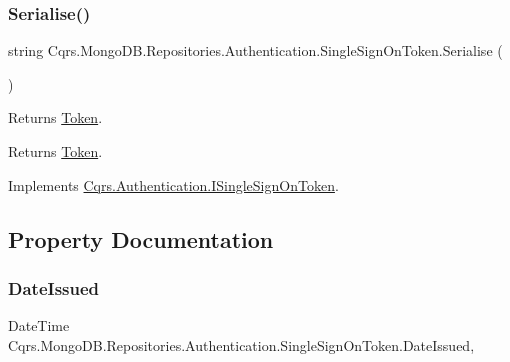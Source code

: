 \subsubsection{\texorpdfstring{Serialise()}{Serialise()}}
{\footnotesize\ttfamily string Cqrs.\+Mongo\+D\+B.\+Repositories.\+Authentication.\+Single\+Sign\+On\+Token.\+Serialise (\begin{DoxyParamCaption}{ }\end{DoxyParamCaption})}



Returns \hyperlink{classCqrs_1_1MongoDB_1_1Repositories_1_1Authentication_1_1SingleSignOnToken_abf59456bf30dd139620ed6de3ee11e74_abf59456bf30dd139620ed6de3ee11e74}{Token}. 

\begin{DoxyReturn}{Returns}
\hyperlink{classCqrs_1_1MongoDB_1_1Repositories_1_1Authentication_1_1SingleSignOnToken_abf59456bf30dd139620ed6de3ee11e74_abf59456bf30dd139620ed6de3ee11e74}{Token}.
\end{DoxyReturn}


Implements \hyperlink{interfaceCqrs_1_1Authentication_1_1ISingleSignOnToken_af34e8c0b052865d687064d3381bfbcdb_af34e8c0b052865d687064d3381bfbcdb}{Cqrs.\+Authentication.\+I\+Single\+Sign\+On\+Token}.



\subsection{Property Documentation}
\mbox{\label{classCqrs_1_1MongoDB_1_1Repositories_1_1Authentication_1_1SingleSignOnToken_acf0a5524d873b709b3955374ec6cc76d_acf0a5524d873b709b3955374ec6cc76d}} 
\subsubsection{\texorpdfstring{Date\+Issued}{DateIssued}}
{\footnotesize\ttfamily Date\+Time Cqrs.\+Mongo\+D\+B.\+Repositories.\+Authentication.\+Single\+Sign\+On\+Token.\+Date\+Issued\hspace{0.3cm}{\ttfamily [get]}, {\ttfamily [set]}}



